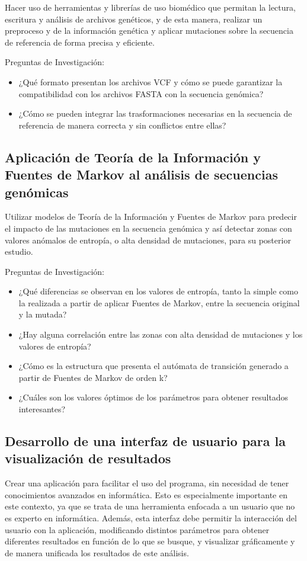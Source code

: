 \documentclass[11pt,spanish,listoffigures,listoftables]{tfgetsinf}
\begin{document}
Hacer uso de herramientas y librerías de uso biomédico que permitan la lectura, escritura y análisis de archivos genéticos, y de esta manera, realizar un preproceso y de la información genética y aplicar mutaciones sobre la secuencia de referencia de forma precisa y eficiente.

Preguntas de Investigación: 
\begin{itemize}
\item ¿Qué formato presentan los archivos VCF y cómo se puede garantizar la compatibilidad con los archivos FASTA con la secuencia genómica?
\item ¿Cómo se pueden integrar las trasformaciones necesarias en la secuencia de referencia de manera correcta y sin conflictos entre ellas?
\end{itemize}

\subsection{Aplicación de Teoría de la Información y Fuentes de Markov al análisis de secuencias genómicas }

Utilizar modelos de Teoría de la Información y Fuentes de Markov para predecir el impacto de las mutaciones en la secuencia genómica y así detectar zonas con valores anómalos de entropía, o alta densidad de mutaciones, para su posterior estudio. 

Preguntas de Investigación: 
\begin{itemize}
\item ¿Qué diferencias se observan en los valores de entropía, tanto la simple como la realizada a partir de aplicar Fuentes de Markov, entre la secuencia original y la mutada? 
\item ¿Hay alguna correlación entre las zonas con alta densidad de mutaciones y los valores de entropía? 
\item ¿Cómo es la estructura que presenta el autómata de transición generado a partir de Fuentes de Markov de orden k? 
\item ¿Cuáles son los valores óptimos de los parámetros para obtener resultados interesantes? 
\end{itemize}

\subsection{Desarrollo de una interfaz de usuario para la visualización de resultados }

Crear una aplicación para facilitar el uso del programa, sin necesidad de tener conocimientos avanzados en informática. Esto es especialmente importante en este contexto, ya que se trata de una herramienta enfocada a un usuario que no es experto en informática. Además, esta interfaz debe permitir la interacción del usuario con la aplicación, modificando distintos parámetros para obtener diferentes resultados en función de lo que se busque, y visualizar gráficamente y de manera unificada los resultados de este análisis. 
\end{document}
